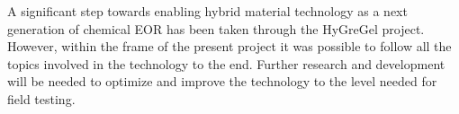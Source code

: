 \documentclass[nanomaterials,article,submit,moreauthors,pdftex]{Definitions/mdpi}
\begin{document}
A significant step towards enabling hybrid material technology as a next generation of chemical EOR has been taken through the HyGreGel project. However, within the frame of the present project it was possible to follow all the topics involved in the technology to the end. Further research and development will be needed to optimize and improve the technology to the level needed for field testing. 








\vspace{6pt} 





\end{document}
